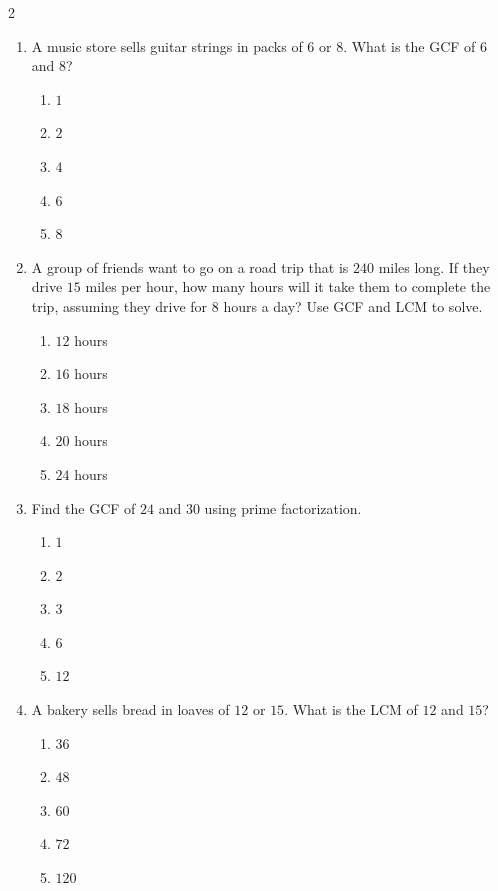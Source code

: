 \documentclass[10pt]{article}
\begin{document}
\begin{multicols}{2}
\begin{enumerate}[label=\textbf{Q\arabic*.}, leftmargin=*, itemsep=6pt, parsep=0pt]
  \item \small A music store sells guitar strings in packs of $6$ or $8$. What is the GCF of $6$ and $8$?
  \begin{enumerate}[label=(\Alph*), leftmargin=0.6cm, nosep, itemsep=2pt]
    \item $1$
    \item $2$
    \item $4$
    \item $6$
    \item $8$
  \end{enumerate}

  \item \small A group of friends want to go on a road trip that is $240$ miles long. If they drive $15$ miles per hour, how many hours will it take them to complete the trip, assuming they drive for $8$ hours a day? Use GCF and LCM to solve.
  \begin{enumerate}[label=(\Alph*), leftmargin=0.6cm, nosep, itemsep=2pt]
    \item $12$ hours
    \item $16$ hours
    \item $18$ hours
    \item $20$ hours
    \item $24$ hours
  \end{enumerate}

  \item \small Find the GCF of $24$ and $30$ using prime factorization.
  \begin{enumerate}[label=(\Alph*), leftmargin=0.6cm, nosep, itemsep=2pt]
    \item $1$
    \item $2$
    \item $3$
    \item $6$
    \item $12$
  \end{enumerate}

  \item \small A bakery sells bread in loaves of $12$ or $15$. What is the LCM of $12$ and $15$?
  \begin{enumerate}[label=(\Alph*), leftmargin=0.6cm, nosep, itemsep=2pt]
    \item $36$
    \item $48$
    \item $60$
    \item $72$
    \item $120$
  \end{enumerate}


\end{enumerate}
\end{multicols}
\end{document}

